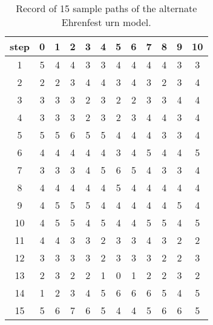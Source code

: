 \documentclass[12pt]{article}
\begin{document}
\begin{example}
    \begin{table}
        \centering
        \begin{tabular}{c|ccccccccccc}
            step   & 0 & 1 & 2 & 3 & 4 & 5 & 6 & 7 & 8 & 9 & 10 \\ 
            \hline
            1      & 5 & 4 & 4 & 3 & 3 & 4 & 4 & 4 & 4 & 3 & 3  \\ 
            2      & 2 & 2 & 3 & 4 & 4 & 3 & 4 & 3 & 2 & 3 & 4  \\ 
            3      & 3 & 3 & 3 & 2 & 3 & 2 & 2 & 3 & 3 & 4 & 4  \\ 
            4      & 3 & 3 & 3 & 2 & 3 & 2 & 3 & 4 & 4 & 3 & 4  \\ 
            5      & 5 & 5 & 6 & 5 & 5 & 4 & 4 & 4 & 3 & 3 & 4  \\ 
            6      & 4 & 4 & 4 & 4 & 4 & 3 & 4 & 5 & 4 & 4 & 5  \\ 
            7      & 3 & 3 & 3 & 4 & 5 & 6 & 5 & 4 & 3 & 3 & 4  \\ 
            8      & 4 & 4 & 4 & 4 & 4 & 5 & 4 & 4 & 4 & 4 & 4  \\ 
            9      & 4 & 5 & 5 & 5 & 4 & 4 & 4 & 4 & 4 & 5 & 4  \\ 
            10     & 4 & 5 & 5 & 4 & 5 & 4 & 4 & 5 & 5 & 4 & 5  \\ 
            11     & 4 & 4 & 3 & 3 & 2 & 3 & 3 & 4 & 3 & 2 & 2  \\ 
            12     & 3 & 3 & 3 & 3 & 2 & 3 & 3 & 3 & 2 & 2 & 3  \\ 
            13     & 2 & 3 & 2 & 2 & 1 & 0 & 1 & 2 & 2 & 3 & 2  \\ 
            14     & 1 & 2 & 3 & 4 & 5 & 6 & 6 & 6 & 5 & 4 & 5  \\ 
            15     & 5 & 6 & 7 & 6 & 5 & 4 & 4 & 5 & 6 & 6 & 5  \\ 
        \end{tabular}
        \caption{Record of 15 sample paths of the alternate Ehrenfest
        urn model.}%
        \label{tab:serialsignificance:recordpaths}
    \end{table}


\end{example}
\end{document}
